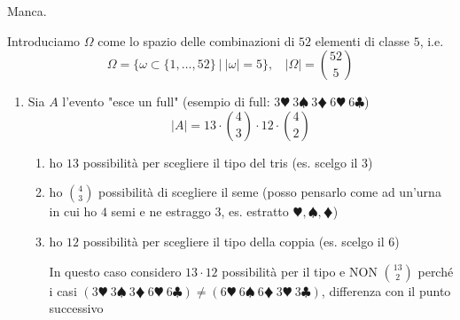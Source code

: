 \Soluzione

Manca.

\Soluzione

Introduciamo $\Omega $ come lo spazio delle combinazioni di $52$ elementi di classe $5$, i.e.
\begin{equation*}
	\Omega =\{\omega \subset \{1,\dots ,52\} \ |\ | \omega | =5\} ,\ \ \ \ | \Omega | =\binom{52}{5}
\end{equation*}
\begin{enumerate}
	\item Sia $A$ l'evento "esce un full" (esempio di full: $3\varheartsuit \ 3\spadesuit \ 3\vardiamondsuit \ 6\varheartsuit \ 6\clubsuit $)\begin{equation*}
	| A| =13\cdot \binom{4}{3} \cdot 12\cdot \binom{4}{2}
	\end{equation*}
	\begin{enumerate}
		\item ho $13$ possibilità per scegliere il tipo del tris (es. scelgo il $3$)
		\item ho $\binom{4}{3}$ possibilità di scegliere il seme (posso pensarlo come ad un'urna in cui ho $4$ semi e ne estraggo $3$, es. estratto $\varheartsuit ,\spadesuit ,\vardiamondsuit $)
		\item ho $12$ possibilità per scegliere il tipo della coppia (es. scelgo il $6$)

		\begin{oss}
			In questo caso considero $13\cdot 12$ possibilità per il tipo e NON $\binom{13}{2}$ perché i casi $(3\varheartsuit \ 3\spadesuit \ 3\vardiamondsuit \ 6\varheartsuit \ 6\clubsuit) \neq (6\varheartsuit \ 6\spadesuit \ 6\vardiamondsuit \ 3\varheartsuit \ 3\clubsuit)$, differenza con il punto successivo
		\end{oss}


\end{enumerate}
\end{enumerate}
